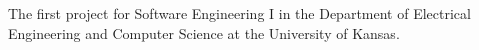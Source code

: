 The first project for Software Engineering I in the Department of Electrical Engineering and Computer Science at the University of Kansas. 